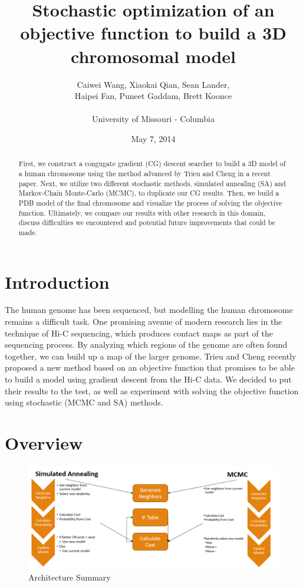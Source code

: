 \documentclass{article}
\title{Stochastic optimization of an objective function to build a 3D chromosomal model}
\author{Caiwei Wang, Xiaokai Qian, Sean Lander, \\Haipei Fan, Puneet Gaddam, Brett Koonce\\\\University of Missouri - Columbia}
\date{May 7, 2014}
\begin{document}
\maketitle

\begin{abstract}

First, we construct a congugate gradient (CG) descent searcher to build a 3D model of a human chromosome using the method advanced by Trieu and Cheng in a recent paper.  Next, we utilize two different stochastic methods, simulated annealing (SA) and Markov-Chain Monte-Carlo (MCMC), to duplicate our CG results.  Then, we build a PDB model of the final chromosome and visualize the process of solving the objective function.  Ultimately, we compare our results with other research in this domain, discuss difficulties we encountered and potential future improvements that could be made.

\end{abstract}

\section{Introduction}

The human genome has been sequenced, but modelling the human chromosome remains a difficult task.  One promising avenue of modern research lies in the technique of Hi-C sequencing, which produces contact maps as part of the sequencing process.  By analyzing which regions of the genome are often found together, we can build up a map of the larger genome.  Trieu and Cheng recently proposed a new method based on an objective function that promises to be able to build a model using gradient descent from the Hi-C data.  We decided to put their results to the test, as well as experiment with solving the objective function using stochastic (MCMC and SA) methods.

\section{Overview}

\begin{figure}[H]
\begin{center}
\includegraphics[width=\textwidth]{architecture}
\caption{Architecture Summary}
\label{Fig:architecture}
\end{center}
\end{figure}
\end{document}
